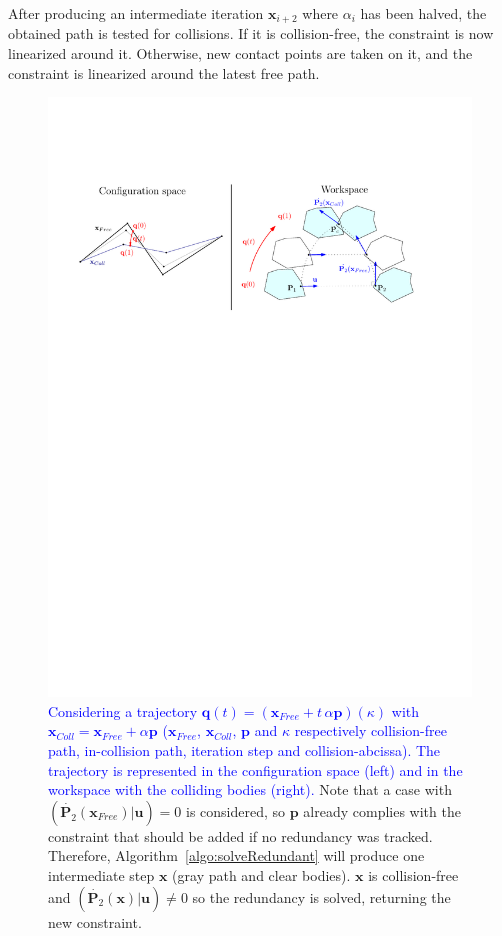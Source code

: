 \documentclass{tADR2e}
\newcommand\p{\mathbf{p}}
\newcommand\conf{\mathbf{q}}
\newcommand\xx{\mathbf{x}} %
\newcommand\po{\mathbf{P}}
\begin{document}
After producing an intermediate iteration $\xx_{i+2}$ where $\alpha_i$ has
been halved, the obtained path is tested for collisions. If it is collision-free, the 
constraint is now linearized around it. Otherwise, new contact points are taken 
on it, and the constraint is linearized around the latest free path.

\begin{figure}
	\centering
	\includegraphics[width=15.8cm]{convergence-diagram.pdf}
	\caption{\textcolor{blue}{Considering a trajectory 
	$\conf (t) = (\xx_{Free} + t\, \alpha \p)(\kappa)$ 
	with $\xx_{Coll} = \xx_{Free} + \alpha\p$ ($\xx_{Free}$, $\xx_{Coll}$, $\p$ 
	and $\kappa$ respectively collision-free path, in-collision path, iteration step 
	and collision-abcissa).
	The trajectory is represented in the configuration space (left) and in the 
	workspace with the colliding bodies (right).}
	Note that a case with 
	$(\dot{\po_2}(\xx_{Free})|\mathbf{u})=0$ is considered, so $\p$ already complies 
	with the constraint that should be added if no redundancy was tracked. Therefore, 
	Algorithm~\ref{algo:solveRedundant} will produce one intermediate step
	$\xx$ (gray path and clear bodies). $\xx$ is collision-free and 
	$(\dot{\po_2}(\xx)|\mathbf{u})\neq 0$ so the redundancy is solved, 
	returning the new constraint.}
	\label{fig:convergence-diagram}
\end{figure}
\end{document}
